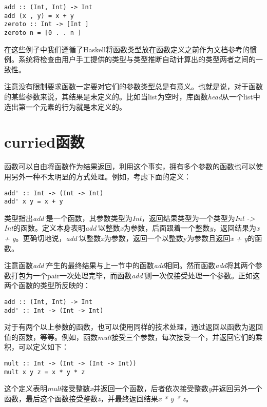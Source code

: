 \begin{verbatim}
add :: (Int, Int) -> Int
add (x , y) = x + y
zeroto :: Int -> [Int ]
zeroto n = [0 . . n ]
\end{verbatim}

在这些例子中我们遵循了Haskell将函数类型放在函数定义之前作为文档参考的惯例。系统将检查由用户手工提供的类型与类型推断自动计算出的类型两者之间的一致性。

注意没有限制要求函数一定要对它们的参数类型总是有意义。也就是说，对于函数的某些参数来说，其结果是未定义的。比如当list为空时，库函数\textit{head}从一个list中选出第一个元素的行为就是未定义的。

\section{curried函数}
函数可以自由将函数作为结果返回，利用这个事实，拥有多个参数的函数也可以使用另外一种不太明显的方式处理。例如，考虑下面的定义：

\begin{verbatim}
add' :: Int -> (Int -> Int)
add' x y = x + y
\end{verbatim}

类型指出\textit{add'}是一个函数，其参数类型为\textit{Int}，返回结果类型为一个类型为\textit{Int
->
Int}的函数。定义本身表明\textit{add'}以整数\textit{x}为参数，后面跟着一个整数\textit{y}，返回结果为\textit{x
+
y}。更确切地说，\textit{add'}以整数\textit{x}为参数，返回一个以整数y为参数且返回\textit{x
+ y}的函数。

注意函数\textit{add'}产生的最终结果与上一节中的函数\textit{add}相同。然而函数\textit{add}将其两个参数打包为一个pair一次处理完毕，而函数\textit{add'}则一次仅接受处理一个参数。正如这两个函数的类型所反映的：

\begin{verbatim}
add :: (Int, Int) -> Int
add' :: Int -> (Int -> Int)
\end{verbatim}

对于有两个以上参数的函数，也可以使用同样的技术处理，通过返回以函数为返回值的函数，等等。例如，函数\textit{mult}接受三个参数，每次接受一个，并返回它们的乘积，可以定义如下：
\begin{verbatim}
mult :: Int -> (Int -> (Int -> Int))
mult x y z = x * y * z
\end{verbatim}

这个定义表明\textit{mult}接受整数\textit{x}并返回一个函数，后者依次接受整数\textit{y}并返回另外一个函数，最后这个函数接受整数\textit{z}，并最终返回结果\textit{x * y * z}。

